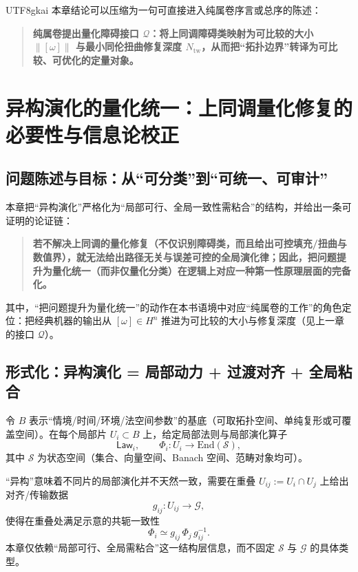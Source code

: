 \documentclass[12pt]{article}
\begin{document}
\begin{CJK*}{UTF8}{gkai}
本章结论可以压缩为一句可直接进入纯属卷序言或总序的陈述：
\begin{quote}
\textbf{纯属卷提出量化障碍接口 $\mathcal{Q}$：将上同调障碍类映射为可比较的大小 $\|[\omega]\|$ 与最小同伦扭曲修复深度 $N_{\mathrm{tw}}$，从而把“拓扑边界”转译为可比较、可优化的定量对象。
  }
\end{quote}

\section{异构演化的量化统一：上同调量化修复的必要性与信息论校正}

\subsection{问题陈述与目标：从“可分类”到“可统一、可审计”}

本章把“异构演化”严格化为“局部可行、全局一致性需粘合”的结构，并给出一条可证明的论证链：
\begin{quote}
\textbf{若不解决上同调的量化修复（不仅识别障碍类，而且给出可控填充/扭曲与数值界），就无法给出路径无关与误差可控的全局演化律；因此，把问题提升为量化统一（而非仅量化分类）在逻辑上对应一种第一性原理层面的完备化。}
\end{quote}
其中，“把问题提升为量化统一”的动作在本书语境中对应“纯属卷的工作”的角色定位：把经典机器的输出从 $[\omega]\in H^n$ 推进为可比较的大小与修复深度（见上一章的接口 $\mathcal{Q}$）。

\subsection{形式化：异构演化 = 局部动力 + 过渡对齐 + 全局粘合}

令 $B$ 表示“情境/时间/环境/法空间参数”的基底（可取拓扑空间、单纯复形或可覆盖空间）。在每个局部片 $U_i\subset B$ 上，给定局部法则与局部演化算子
\[
  \mathsf{Law}_i,\qquad
  \Phi_i:U_i\to \mathrm{End}(\mathcal{S}),
\]
其中 $\mathcal{S}$ 为状态空间（集合、向量空间、Banach 空间、范畴对象均可）。

“异构”意味着不同片的局部演化并不天然一致，需要在重叠 $U_{ij}:=U_i\cap U_j$ 上给出对齐/传输数据
\[
  g_{ij}:U_{ij}\to \mathcal{G},
\]
使得在重叠处满足示意的共轭一致性
\[
  \Phi_i \simeq g_{ij}\,\Phi_j\,g_{ij}^{-1}.
\]
本章仅依赖“局部可行、全局需粘合”这一结构层信息，而不固定 $\mathcal{S}$ 与 $\mathcal{G}$ 的具体类型。


\end{CJK*}
\end{document}
